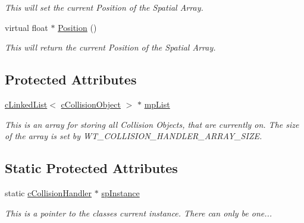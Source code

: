 \begin{DoxyCompactItemize}
\begin{DoxyCompactList}\small\item\em This will set the current Position of the Spatial Array. \end{DoxyCompactList}\item 
\hypertarget{classc_collision_handler_af02385e0c91e4c73c521e65477efed2c}{
virtual float $\ast$ \hyperlink{classc_collision_handler_af02385e0c91e4c73c521e65477efed2c}{Position} ()}
\label{classc_collision_handler_af02385e0c91e4c73c521e65477efed2c}

\begin{DoxyCompactList}\small\item\em This will return the current Position of the Spatial Array. \end{DoxyCompactList}\end{DoxyCompactItemize}
\subsection*{Protected Attributes}
\begin{DoxyCompactItemize}
\item 
\hypertarget{classc_collision_handler_a959870d5beee77a014b29e45bf153723}{
\hyperlink{classc_linked_list}{cLinkedList}$<$ \hyperlink{classc_collision_object}{cCollisionObject} $>$ $\ast$ \hyperlink{classc_collision_handler_a959870d5beee77a014b29e45bf153723}{mpList}}
\label{classc_collision_handler_a959870d5beee77a014b29e45bf153723}

\begin{DoxyCompactList}\small\item\em This is an array for storing all Collision Objects, that are currently on. The size of the array is set by WT\_\-COLLISION\_\-HANDLER\_\-ARRAY\_\-SIZE. \end{DoxyCompactList}\end{DoxyCompactItemize}
\subsection*{Static Protected Attributes}
\begin{DoxyCompactItemize}
\item 
\hypertarget{classc_collision_handler_ae020327c284763548d259a3d35a8f537}{
static \hyperlink{classc_collision_handler}{cCollisionHandler} $\ast$ \hyperlink{classc_collision_handler_ae020327c284763548d259a3d35a8f537}{spInstance}}
\label{classc_collision_handler_ae020327c284763548d259a3d35a8f537}

\begin{DoxyCompactList}\small\item\em This is a pointer to the classes current instance. There can only be one... \end{DoxyCompactList}\end{DoxyCompactItemize}
